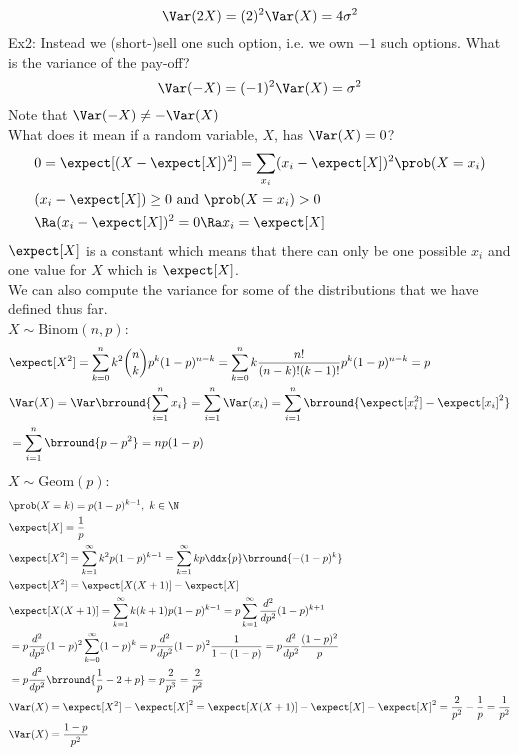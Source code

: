 \[\Var(2X)=(2)^2\Var(X)=4\sigma^2\]
Ex2: Instead we (short-)sell one such option, i.e. we own $-1$ such options. What is the variance of the pay-off?
\[\Var(-X)=(-1)^2\Var(X)=\sigma^2\]
Note that $\Var(-X)\neq -\Var(X)$\\
What does it mean if a random variable, $X$, has $\Var(X)=0$?
\begin{align*}
    &0=\expect[(X-\expect[X])^2]=\sum_{x_i}(x_i-\expect[X])^2\prob(X=x_i)\\
    &(x_i-\expect[X])\geq 0\text{ and }\prob(X=x_i)>0\\
    &\Ra (x_i-\expect[X])^2=0\Ra x_i=\expect[X]
\end{align*}
$\expect[X]$ is a constant which means that there can only be one possible $x_i$ and one value for $X$ which is $\expect[X]$.\\
We can also compute the variance for some of the distributions that we have defined thus far.\\
$X\sim\mathrm{Binom}(n,p)$:
\begin{align*}
    &\expect[X^2]=\sum_{k=0}^n k^2\binom{n}{k}p^k(1-p)^{n-k}=\sum_{k=0}^nk\frac{n!}{(n-k)!(k-1)!}p^k(1-p)^{n-k}=p\\
    &\Var(X)=\Var\brround{\sum_{i=1}^n x_i}=\sum_{i=1}^n\Var(x_i)=\sum_{i=1}^n\brround{\expect[x_i^2]-\expect[x_i]^2}\\
    &=\sum_{i=1}^n\brround{p-p^2}=np(1-p)
\end{align*}
$X\sim\mathrm{Geom}(p)$:
\begin{align*}
    &\prob(X=k)=p(1-p)^{k-1},\ k\in\N\\
    &\expect[X]=\frac{1}{p}\\
    &\expect[X^2]=\sum_{k=1}^\infty k^2p(1-p)^{k-1}=\sum_{k=1}^\infty kp\ddx{p}\brround{-(1-p)^k}\\
    &\expect[X^2]=\expect[X(X+1)]-\expect[X]\\
    &\expect[X(X+1)]=\sum_{k=1}^\infty k(k+1)p(1-p)^{k-1}=p\sum_{k=1}^\infty \frac{d^2}{dp^2}(1-p)^{k+1}\\
    &=p\frac{d^2}{dp^2}(1-p)^2\sum_{k=0}^\infty(1-p)^k=p\frac{d^2}{dp^2}(1-p)^2\frac{1}{1-(1-p)}=p\frac{d^2}{dp^2}\frac{(1-p)^2}{p}\\
    &=p\frac{d^2}{dp^2}\brround{\frac{1}{p}-2+p}=p\frac{2}{p^3}=\frac{2}{p^2}\\
    &\Var(X)=\expect[X^2]-\expect[X]^2=\expect[X(X+1)]-\expect[X]-\expect[X]^2=\frac{2}{p^2}-\frac{1}{p}=\frac{1}{p^2}\\
    &\Var(X)=\frac{1-p}{p^2}
\end{align*}
